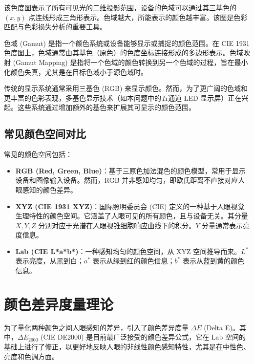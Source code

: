 该色度图表示了所有可见光的二维投影范围，设备的色域可以通过其三基色的 $(x,y)$ 点连线形成三角形表示。色域越大，所能表示的颜色越丰富。该图是色彩匹配与色彩损失分析的重要工具。

色域 (Gamut) 是指一个颜色系统或设备能够显示或捕捉的颜色范围。在 CIE 1931 色度图上，色域通常由其基色（原色）的色度坐标连接形成的多边形表示。色域映射 (Gamut Mapping) 是指将一个色域的颜色转换到另一个色域的过程，旨在最小化颜色失真，尤其是在目标色域小于源色域时。

传统的显示系统通常采用三基色 (RGB) 来显示颜色。然而，为了更广阔的色域和更丰富的色彩表现，多基色显示技术（如本问题中的五通道 LED 显示屏）正在兴起。这些系统通过增加额外的基色来扩展其可显示的颜色范围。

\subsection[\hspace{-2pt}常见颜色空间对比]{{\heiti{} \hspace{-8pt}常见颜色空间对比}}\label{subsection2: 常见颜色空间对比}

常见的颜色空间包括：

\begin{itemize}
    \item \textbf{RGB (Red, Green, Blue)}：基于三原色加法混色的颜色模型，常用于显示设备和图像输入设备。然而，RGB 并非感知均匀，即欧氏距离不直接对应人眼感知的颜色差异。
    \item \textbf{XYZ (CIE 1931 XYZ)}：国际照明委员会 (CIE) 定义的一种基于人眼视觉生理特性的颜色空间。它涵盖了人眼可见的所有颜色，且与设备无关。其分量 $X, Y, Z$ 分别对应于光谱在人眼视锥细胞响应曲线下的积分。$Y$ 分量通常表示亮度信息。
    \item \textbf{Lab (CIE L*a*b*)}：一种感知均匀的颜色空间，从 XYZ 空间推导而来。$L^*$ 表示亮度，从黑到白；$a^*$ 表示从绿到红的颜色信息；$b^*$ 表示从蓝到黄的颜色信息。
\end{itemize}

\section[\hspace{-2pt}颜色差异度量理论]{{\heiti{} \hspace{-8pt}颜色差异度量理论}}\label{section2: 颜色差异度量理论}

为了量化两种颜色之间人眼感知的差异，引入了颜色差异度量 $\Delta E$ (Delta E)。其中，$\Delta E_{2000}$ (CIE DE2000) 是目前最广泛接受的颜色差异公式，它在 Lab 空间的基础上进行了修正，以更好地反映人眼的非线性颜色感知特性，尤其是在中性色、亮度和色调方面。

